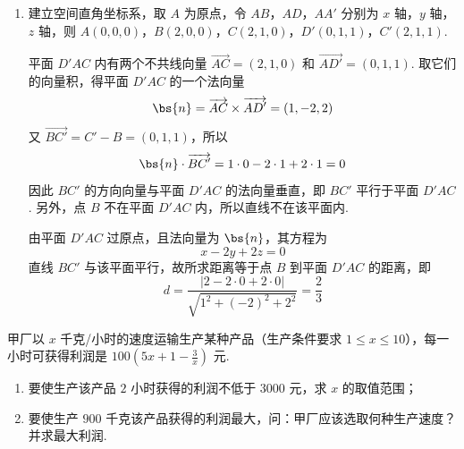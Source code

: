 \begin{solution}
\begin{enumerate}
\item 建立空间直角坐标系，取 \(A\) 为原点，令 \(AB\)，\(AD\)，\(AA'\) 分别为 \(x\) 轴，\(y\) 轴，\(z\) 轴，则
\(A(0,0,0)\)，\(B(2,0,0)\)，\(C(2,1,0)\)，\(D'(0,1,1)\)，\(C'(2,1,1)\).

平面 \(D'AC\) 内有两个不共线向量 \(\overrightarrow{AC}=(2,1,0)\) 和 \(\overrightarrow{AD'}=(0,1,1)\). 取它们的向量积，得平面 \(D'AC\) 的一个法向量
\[
\bs{n}=\overrightarrow{AC}\times\overrightarrow{AD'}=(1,-2,2)
\]
又 \(\overrightarrow{BC'}=C'-B=(0,1,1)\)，所以
\[
\bs{n}\cdot\overrightarrow{BC'}=1\cdot0-2\cdot1+2\cdot1=0
\]
因此 \(BC'\) 的方向向量与平面 \(D'AC\) 的法向量垂直，即 \(BC'\) 平行于平面 \(D'AC\). 另外，点 \(B\) 不在平面 \(D'AC\) 内，所以直线不在该平面内.

由平面 \(D'AC\) 过原点，且法向量为 \(\bs{n}\)，其方程为
\[
x-2y+2z=0
\]
直线 \(BC'\) 与该平面平行，故所求距离等于点 \(B\) 到平面 \(D'AC\) 的距离，即
\[
d=\frac{|2-2\cdot0+2\cdot0|}{\sqrt{1^2+(-2)^2+2^2}}=\frac{2}{3}
\]
\end{enumerate}
\end{solution}

\begin{problem}
甲厂以 \(x\) 千克/小时的速度运输生产某种产品（生产条件要求 \(1\leqslant x\leqslant 10\)），每一小时可获得利润是 \(100\left(5x+1-\frac{3}{x}\right)\) 元.
\begin{enumerate}
\item 要使生产该产品 \(2\) 小时获得的利润不低于 \(3000\) 元，求 \(x\) 的取值范围；
\item 要使生产 \(900\) 千克该产品获得的利润最大，问：甲厂应该选取何种生产速度？并求最大利润.
\end{enumerate}
\end{problem}

